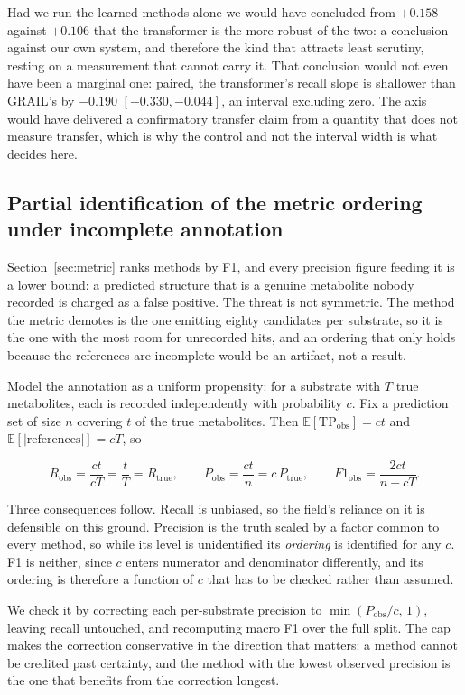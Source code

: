 Had we run the learned methods alone we would have concluded from $+0.158$ against $+0.106$ that the
transformer is the more robust of the two: a conclusion against our own system, and therefore the
kind that attracts least scrutiny, resting on a measurement that cannot carry it. That conclusion
would not even have been a marginal one: paired, the transformer's recall slope is shallower than
GRAIL's by $-0.190$ $[-0.330,-0.044]$, an interval excluding zero. The axis would have delivered a
confirmatory transfer claim from a quantity that does not measure transfer, which is why the control
and not the interval width is what decides here.

\subsection{Partial identification of the metric ordering under incomplete annotation}
\label{app:propensity}

Section~\ref{sec:metric} ranks methods by F1, and every precision figure feeding it is a lower
bound: a predicted structure that is a genuine metabolite nobody recorded is charged as a false
positive. The threat is not symmetric. The method the metric demotes is the one emitting eighty
candidates per substrate, so it is the one with the most room for unrecorded hits, and an ordering
that only holds because the references are incomplete would be an artifact, not a result.

Model the annotation as a uniform propensity: for a substrate with $T$ true metabolites, each is
recorded independently with probability $c$. Fix a prediction set of size $n$ covering $t$ of the
true metabolites. Then $\mathbb{E}[\text{TP}_{\text{obs}}] = ct$ and
$\mathbb{E}[|\text{references}|] = cT$, so

\[
R_{\text{obs}} = \frac{ct}{cT} = \frac{t}{T} = R_{\text{true}},
\qquad
P_{\text{obs}} = \frac{ct}{n} = c\,P_{\text{true}},
\qquad
F1_{\text{obs}} = \frac{2ct}{n + cT}.
\]

Three consequences follow. Recall is unbiased, so the field's reliance on it is defensible on
this ground. Precision is the truth scaled by a factor common to every method, so
while its level is unidentified its \emph{ordering} is identified for any $c$. F1 is neither, since
$c$ enters numerator and denominator differently, and its ordering is therefore a function of $c$
that has to be checked rather than assumed.

We check it by correcting each per-substrate precision to $\min(P_{\text{obs}}/c,\,1)$, leaving
recall untouched, and recomputing macro F1 over the full split. The cap makes the correction
conservative in the direction that matters: a method cannot be credited past certainty, and the
method with the lowest observed precision is the one that benefits from the correction longest.

